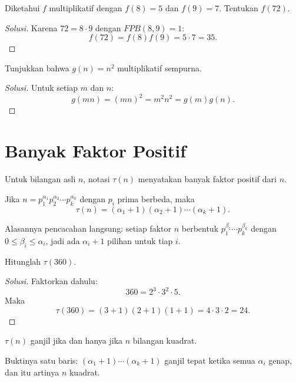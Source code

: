 \documentclass[12pt]{scrartcl}
\begin{document}
\begin{example}
Diketahui $f$ multiplikatif dengan $f(8) = 5$ dan $f(9) = 7$.
Tentukan $f(72)$.
\end{example}
\begin{proof}[Solusi]
Karena $72 = 8 \cdot 9$ dengan $FPB(8, 9) = 1$:
\[ f(72) = f(8)f(9) = 5 \cdot 7 = 35. \]
\end{proof}

\begin{example}
Tunjukkan bahwa $g(n) = n^2$ multiplikatif sempurna.
\end{example}
\begin{proof}[Solusi]
Untuk setiap $m$ dan $n$:
\[ g(mn) = (mn)^2 = m^2n^2 = g(m)g(n). \]
\end{proof}

\section{Banyak Faktor Positif}

\begin{definition}
Untuk bilangan asli $n$, notasi $\tau(n)$ menyatakan banyak faktor positif dari $n$.
\end{definition}

\begin{theorem}
Jika $n = p_1^{\alpha_1} p_2^{\alpha_2} \cdots p_k^{\alpha_k}$ dengan $p_i$ prima berbeda, maka
\[ \tau(n) = (\alpha_1 + 1)(\alpha_2 + 1) \cdots (\alpha_k + 1). \]
\end{theorem}

Alasannya pencacahan langsung: setiap faktor $n$ berbentuk
$p_1^{\beta_1} \cdots p_k^{\beta_k}$ dengan $0 \le \beta_i \le \alpha_i$,
jadi ada $\alpha_i + 1$ pilihan untuk tiap $i$.

\begin{example}
Hitunglah $\tau(360)$.
\end{example}
\begin{proof}[Solusi]
Faktorkan dahulu:
\[ 360 = 2^3 \cdot 3^2 \cdot 5. \]
Maka
\[ \tau(360) = (3 + 1)(2 + 1)(1 + 1) = 4 \cdot 3 \cdot 2 = 24. \]
\end{proof}

\begin{fact}
$\tau(n)$ ganjil jika dan hanya jika $n$ bilangan kuadrat.
\end{fact}

Buktinya satu baris: $(\alpha_1 + 1) \cdots (\alpha_k + 1)$ ganjil tepat ketika
semua $\alpha_i$ genap, dan itu artinya $n$ kuadrat.
\end{document}
